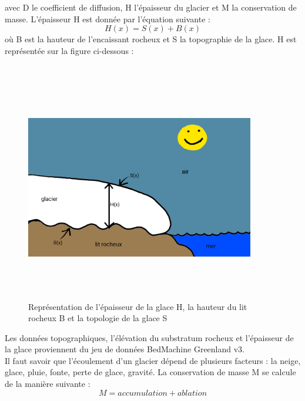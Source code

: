 \documentclass{article}
\begin{document}
avec D le coefficient de diffusion, H l'épaisseur du glacier et M la conservation de masse.
\newpage
L'épaisseur H est donnée par l'équation suivante :
\begin{equation}
H(x) = S(x) + B(x)
\label{eq4}
\end{equation}
où B est la hauteur de l'encaissant rocheux et S la topographie de la glace. H est représentée sur la figure ci-dessous : 
\\
\\
\begin{figure}[!htpb]
\centering
\includegraphics[width=10cm, keepaspectratio=true, height=10cm]{H.png}
\caption{Représentation de l'épaisseur de la glace H, la hauteur du lit rocheux B et la topologie de la glace S}
\label{fig01ch1}
\end{figure}
Les données topographiques, l'élévation du substratum rocheux et l'épaisseur de la glace proviennent du jeu de données BedMachine Greenland v3. 
\\

Il faut savoir que l'écoulement d'un glacier dépend de plusieurs facteurs : la neige, glace, pluie, fonte, perte de glace, gravité. La conservation de masse M se calcule de la manière suivante :
\begin{equation}
M = accumulation + ablation
\label{5}
\end{equation}
\end{document}
